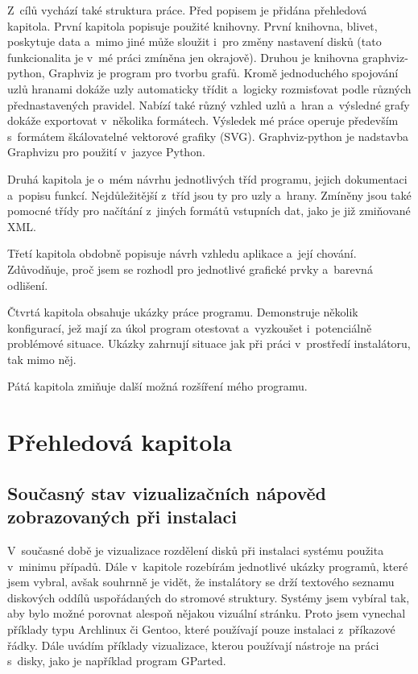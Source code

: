 \documentclass[color,table,oneside,nolot,nolof]{fithesis}
\begin{document}
	Z~cílů vychází také struktura práce. Před popisem je přidána přehledová kapitola.
	První kapitola popisuje použité knihovny. První knihovna, blivet\cite{blivet}, poskytuje data a~mimo jiné může sloužit i~pro změny 
	nastavení disků (tato funkcionalita je v~mé práci zmíněna jen okrajově). Druhou je knihovna graphviz-python\cite{graphviz-python}, Graphviz je program pro tvorbu grafů. Kromě
	jednoduchého spojování uzlů hranami dokáže uzly automaticky třídit a~logicky rozmisťovat podle různých přednastavených pravidel. Nabízí také různý vzhled uzlů
	a~hran a~výsledné grafy dokáže exportovat v~několika formátech. Výsledek mé práce operuje především s~formátem škálovatelné vektorové grafiky (SVG). Graphviz-python je 
	nadstavba Graphvizu pro použití v~jazyce Python.

	Druhá kapitola je o~mém návrhu jednotlivých tříd programu, jejich dokumentaci a~popisu funkcí. Nejdůležitější z~tříd jsou ty pro uzly a~hrany. Zmíněny jsou také pomocné třídy 
	pro načítání z~jiných formátů vstupních dat, jako je již zmiňované XML.

	Třetí kapitola obdobně popisuje návrh vzhledu aplikace a~její chování. Zdůvodňuje, proč jsem se rozhodl pro jednotlivé grafické prvky a~barevná odlišení.

	Čtvrtá kapitola obsahuje ukázky práce programu. Demonstruje několik konfigurací, jež mají za úkol program otestovat a~vyzkoušet i~potenciálně problémové situace. Ukázky  
	zahrnují situace jak při práci v~prostředí instalátoru, tak mimo něj.

	Pátá kapitola zmiňuje další možná rozšíření mého programu. 

\chapter{Přehledová kapitola}
\section{Současný stav vizualizačních nápověd zobrazovaných při instalaci}

V~současné době je vizualizace rozdělení disků při instalaci systému použita v~minimu případů. Dále v~kapitole rozebírám jednotlivé ukázky programů, které jsem vybral, avšak souhrnně je vidět, 
že instalátory se drží textového seznamu diskových oddílů uspořádaných do stromové struktury. Systémy jsem vybíral tak, aby bylo možné porovnat alespoň nějakou vizuální stránku. Proto jsem vynechal
příklady typu Archlinux či Gentoo, které používají pouze instalaci z~příkazové řádky.  Dále uvádím příklady vizualizace, kterou používají nástroje na práci s~disky, jako je 
například program GParted.
\end{document}
